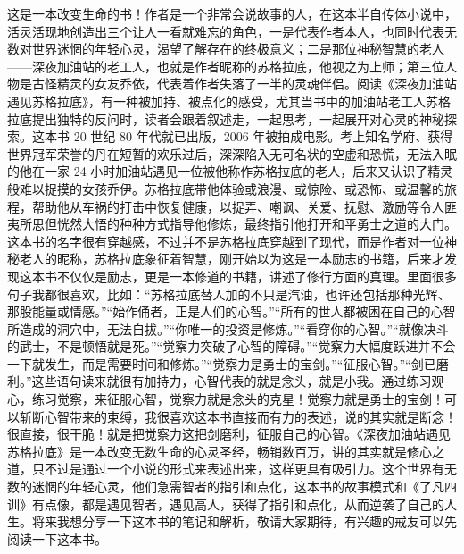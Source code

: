 \begin{book}
    这是一本改变生命的书！作者是一个非常会说故事的人，在这本半自传体小说中，活灵活现地创造出三个让人一看就难忘的角色，一是代表作者本人，也同时代表无数对世界迷惘的年轻心灵，渴望了解存在的终极意义；二是那位神秘智慧的老人——深夜加油站的老工人，也就是作者昵称的苏格拉底，他视之为上师；第三位人物是古怪精灵的女友乔依，代表着作者失落了一半的灵魂伴侣。阅读《深夜加油站遇见苏格拉底》，有一种被加持、被点化的感受，尤其当书中的加油站老工人苏格拉底提出独特的反问时，读者会跟着叙述走，一起思考，一起展开对心灵的神秘探索。这本书 20 世纪 80 年代就已出版，2006 年被拍成电影。考上知名学府、获得世界冠军荣誉的丹在短暂的欢乐过后，深深陷入无可名状的空虚和恐慌，无法入眠的他在一家 24 小时加油站遇见一位被他称作苏格拉底的老人，后来又认识了精灵般难以捉摸的女孩乔伊。苏格拉底带他体验或浪漫、或惊险、或恐怖、或温馨的旅程，帮助他从车祸的打击中恢复健康，以捉弄、嘲讽、关爱、抚慰、激励等令人匪夷所思但恍然大悟的种种方式指导他修炼，最终指引他打开和平勇士之道的大门。这本书的名字很有穿越感，不过并不是苏格拉底穿越到了现代，而是作者对一位神秘老人的昵称，苏格拉底象征着智慧，刚开始以为这是一本励志的书籍，后来才发现这本书不仅仅是励志，更是一本修道的书籍，讲述了修行方面的真理。里面很多句子我都很喜欢，比如：“苏格拉底替人加的不只是汽油，也许还包括那种光辉、那股能量或情感。”“始作俑者，正是人们的心智。”“所有的世人都被困在自己的心智所造成的洞穴中，无法自拔。”“你唯一的投资是修炼。”“看穿你的心智。”“就像决斗的武士，不是顿悟就是死。”“觉察力突破了心智的障碍。”“觉察力大幅度跃进并不会一下就发生，而是需要时间和修炼。”“觉察力是勇士的宝剑。”“征服心智。”“剑已磨利。”这些语句读来就很有加持力，心智代表的就是念头，就是小我。通过练习观心，练习觉察，来征服心智，觉察力就是念头的克星！觉察力就是勇士的宝剑！可以斩断心智带来的束缚，我很喜欢这本书直接而有力的表述，说的其实就是断念！很直接，很干脆！就是把觉察力这把剑磨利，征服自己的心智。《深夜加油站遇见苏格拉底》是一本改变无数生命的心灵圣经，畅销数百万，讲的其实就是修心之道，只不过是通过一个小说的形式来表述出来，这样更具有吸引力。这个世界有无数的迷惘的年轻心灵，他们急需智者的指引和点化，这本书的故事模式和《了凡四训》有点像，都是遇见智者，遇见高人，获得了指引和点化，从而逆袭了自己的人生。将来我想分享一下这本书的笔记和解析，敬请大家期待，有兴趣的戒友可以先阅读一下这本书。
\end{book}
